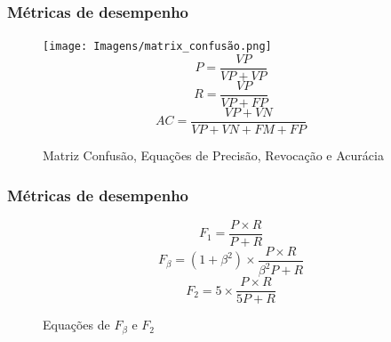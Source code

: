 \documentclass{beamer}
\begin{document}
\begin{frame}
    \frametitle{Métricas de desempenho}
    \begin{figure}[!ht]
        \centering
            \texttt{[image: Imagens/matrix\_confusão.png]}
            \begin{equation} P = \frac{VP}{VP + VP} \end{equation}
            \begin{equation}R = \frac{VP}{VP + FP}\end{equation}
            \begin{equation}AC = \frac{VP + VN}{VP + VN + FM + FP}\end{equation}
        \caption{Matriz Confusão, Equações de Precisão, Revocação e Acurácia}         
        \label{fig:metricas}
    \end{figure}
\end{frame}

\begin{frame}
    \frametitle{Métricas de desempenho}
    \begin{figure}[!ht]
        \centering
        \begin{equation}F_1 = \frac {P \times R}{P + R}\end{equation}
            \begin{equation}F_\beta = (1+\beta^2) \times \frac {P \times R}{\beta^2 P + R}\end{equation}
            \begin{equation}F_2 = 5 \times \frac {P \times R}{5 P + R}\end{equation}    
        \caption{Equações de $F_\beta$ e $F_2$}         
        \label{fig:metricas}
    \end{figure}
\end{frame}  
\end{document}
